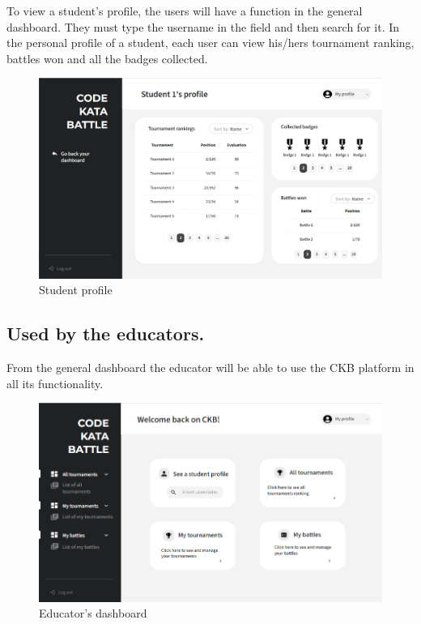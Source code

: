 To view a student's profile, the users will have a function in the general dashboard. They must type the username in the field and then search for it. In the personal profile of a student, each user can view his/hers tournament ranking, battles won and all the badges collected. 
\begin{figure}[h]
    \centering
    \includegraphics[width=\textwidth]{images/mockups/profile.png}
    \caption{Student profile}
    \label{fig:profile}
\end{figure}
\clearpage

\subsection*{Used by the educators.}
From the general dashboard the educator will be able to use the CKB platform in all its functionality. 
\begin{figure}[h]
    \centering
    \includegraphics[width=\textwidth]{images/mockups/educators/Edashboard.png}
    \caption{Educator's dashboard}
    \label{fig:dashE}
\end{figure}


